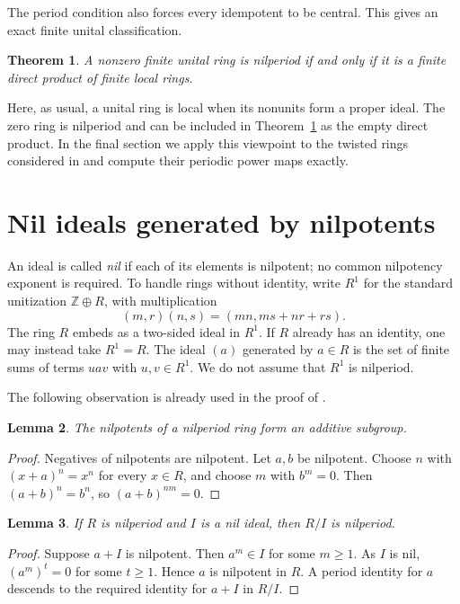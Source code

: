 \documentclass[11pt]{article}
\newtheorem{theorem}{Theorem}
\newtheorem{lemma}[theorem]{Lemma}
\theoremstyle{remark}
\begin{document}
The period condition also forces every idempotent to be central. This gives
an exact finite unital classification.

\begin{theorem}\label{thm:finite}
A nonzero finite unital ring is nilperiod if and only if it is a finite direct
product of finite local rings.
\end{theorem}

Here, as usual, a unital ring is local when its nonunits form a proper ideal.
The zero ring is nilperiod and can be included in Theorem~\ref{thm:finite}
as the empty direct product.
In the final section we apply this viewpoint to the twisted rings considered
in \cite[Example~2.2]{Burnette} and compute their periodic power maps exactly.

\section{Nil ideals generated by nilpotents}
An ideal is called \emph{nil} if each of its elements is nilpotent; no common
nilpotency exponent is required. To handle rings without identity, write
$R^1$ for the standard unitization $\mathbb Z\oplus R$, with multiplication
\[
 (m,r)(n,s)=(mn,ms+nr+rs).
\]
The ring $R$ embeds as a two-sided ideal in $R^1$. If $R$ already has an
identity, one may instead take $R^1=R$. The ideal $(a)$ generated by $a\in R$
is the set of finite sums of terms $uav$ with $u,v\in R^1$.
We do not assume that $R^1$ is nilperiod.

The following observation is already used in the proof of
\cite[Theorem~2.9]{Burnette}.

\begin{lemma}\label{lem:add}
The nilpotents of a nilperiod ring form an additive subgroup.
\end{lemma}
\begin{proof}
Negatives of nilpotents are nilpotent. Let $a,b$ be nilpotent. Choose $n$
with $(x+a)^n=x^n$ for every $x\in R$, and choose $m$ with $b^m=0$.
Then $(a+b)^n=b^n$, so $(a+b)^{nm}=0$.
\end{proof}

\begin{lemma}\label{lem:quotient}
If $R$ is nilperiod and $I$ is a nil ideal, then $R/I$ is nilperiod.
\end{lemma}
\begin{proof}
Suppose $a+I$ is nilpotent. Then $a^m\in I$ for some $m\geq1$.
As $I$ is nil, $(a^m)^t=0$ for some $t\geq1$. Hence $a$ is nilpotent
in $R$. A period identity for $a$ descends to the required identity for
$a+I$ in $R/I$.
\end{proof}
\end{document}
